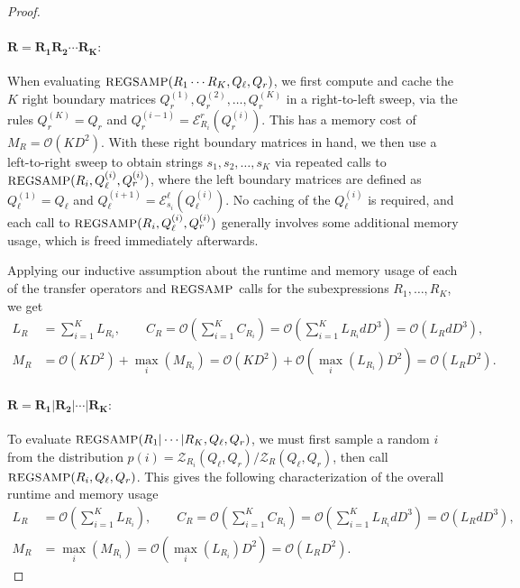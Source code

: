 \documentclass[twoside]{article}
\newcommand{\Sample}{\textsc{\small REGSAMP}}
\newcommand{\bigO}{\mc{O}}
\newcommand{\EL}{\mc{E}^{\scriptstyle \ell}}
\newcommand{\ER}{\mc{E}^{\scriptstyle r}}
\newcommand{\QL}{Q_{\ell}}
\newcommand{\QR}{Q_{r}}
\newcommand{\mc}[1]{\mathcal{#1}}
\begin{document}
\begin{proof}
\paragraph{$\mathbf{R = R_1 R_2 \cdots R_K:}$} When evaluating $\Sample(R_1 \cdots R_K, \QL, \QR)$, we first compute and cache the $K$ right boundary matrices $\QR^{(1)}, \QR^{(2)}, \ldots, \QR^{(K)}$ in a right-to-left sweep, via the rules $\QR^{(K)} = \QR$ and $\QR^{(i-1)} = \ER_{R_i}(\QR^{(i)})$. This has a memory cost of $M_R = \bigO(K D^2)$. With these right boundary matrices in hand, we then use a left-to-right sweep to obtain strings $s_1, s_2, \ldots, s_K$ via repeated calls to $\Sample(R_i, \QL^{(i)}, \QR^{(i)})$, where the left boundary matrices are defined as $\QL^{(1)} = \QL$ and $\QL^{(i+1)} = \EL_{s_i}(\QL^{(i)})$. No caching of the $\QL^{(i)}$ is required, and each call to $\Sample(R_i, \QL^{(i)}, \QR^{(i)})$ generally involves some additional memory usage, which is freed immediately afterwards. 

Applying our inductive assumption about the runtime and memory usage of each of the transfer operators and $\Sample$ calls for the subexpressions $R_1, \ldots, R_K$, we get
%
\begin{align*}
    L_R &= \sum_{i=1}^K L_{R_i}, \qquad C_R = \bigO\!\left(\sum_{i=1}^K C_{R_i}\right) = \bigO\!\left(\sum_{i=1}^K L_{R_i} d D^3\right) = \bigO(L_R d D^3), \\
    M_R &= \bigO(K D^2) + \max_{i}(M_{R_i}) = \bigO(K D^2) + \bigO(\max_i(L_{R_i})D^2) = \bigO(L_R D^2).
\end{align*}
%
\paragraph{$\mathbf{R = R_1 | R_2 | \cdots | R_K:}$} To evaluate $\Sample(R_1 | \cdots | R_K, \QL, \QR)$, we must first sample a random $i$ from the distribution $p(i) = \mc{Z}_{R_i}(\QL, \QR) / \mc{Z}_R(\QL, \QR)$, then call $\Sample(R_i, \QL, \QR)$. This gives the following characterization of the overall runtime and memory usage
%
\begin{align*}
    L_R &= \bigO\left(\sum_{i=1}^K L_{R_i}\right), \qquad C_R = \bigO\!\left(\sum_{i=1}^K C_{R_i}\right) = \bigO\!\left(\sum_{i=1}^K L_{R_i} d D^3\right) = \bigO(L_R d D^3), \\
    M_R &= \max_i(M_{R_i}) = \bigO(\max_i(L_{R_i}) D^2) = \bigO(L_R D^2).
\end{align*}

\end{proof}
\end{document}
